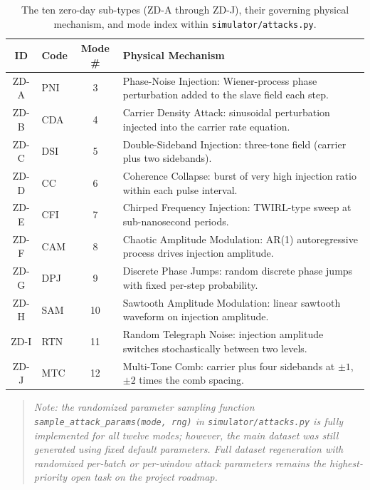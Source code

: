 \documentclass[12pt, a4paper]{report}
\begin{document}
\begin{table}[h]
\centering
\caption{The ten zero-day sub-types (ZD-A through ZD-J), their governing physical mechanism, and mode index within \texttt{simulator/attacks.py}.}
\label{tab:zd_taxonomy}
\begin{tabular}{@{}clcp{6cm}@{}}
\toprule
\textbf{ID} & \textbf{Code} & \textbf{Mode \#} & \textbf{Physical Mechanism} \\
\midrule
ZD-A & PNI & 3  & Phase-Noise Injection: Wiener-process phase perturbation added to the slave field each step. \\
ZD-B & CDA & 4  & Carrier Density Attack: sinusoidal perturbation injected into the carrier rate equation. \\
ZD-C & DSI & 5  & Double-Sideband Injection: three-tone field (carrier plus two sidebands). \\
ZD-D & CC  & 6  & Coherence Collapse: burst of very high injection ratio within each pulse interval. \\
ZD-E & CFI & 7  & Chirped Frequency Injection: TWIRL-type sweep at sub-nanosecond periods. \\
ZD-F & CAM & 8  & Chaotic Amplitude Modulation: AR(1) autoregressive process drives injection amplitude. \\
ZD-G & DPJ & 9  & Discrete Phase Jumps: random discrete phase jumps with fixed per-step probability. \\
ZD-H & SAM & 10 & Sawtooth Amplitude Modulation: linear sawtooth waveform on injection amplitude. \\
ZD-I & RTN & 11 & Random Telegraph Noise: injection amplitude switches stochastically between two levels. \\
ZD-J & MTC & 12 & Multi-Tone Comb: carrier plus four sidebands at $\pm1$, $\pm2$ times the comb spacing. \\
\bottomrule
\end{tabular}
\end{table}

\begin{quote}
\textit{Note: the randomized parameter sampling function \texttt{sample\_attack\_params(mode, rng)} in \texttt{simulator/attacks.py} is fully implemented for all twelve modes; however, the main dataset was still generated using fixed default parameters. Full dataset regeneration with randomized per-batch or per-window attack parameters remains the highest-priority open task on the project roadmap.}
\end{quote}
\end{document}
